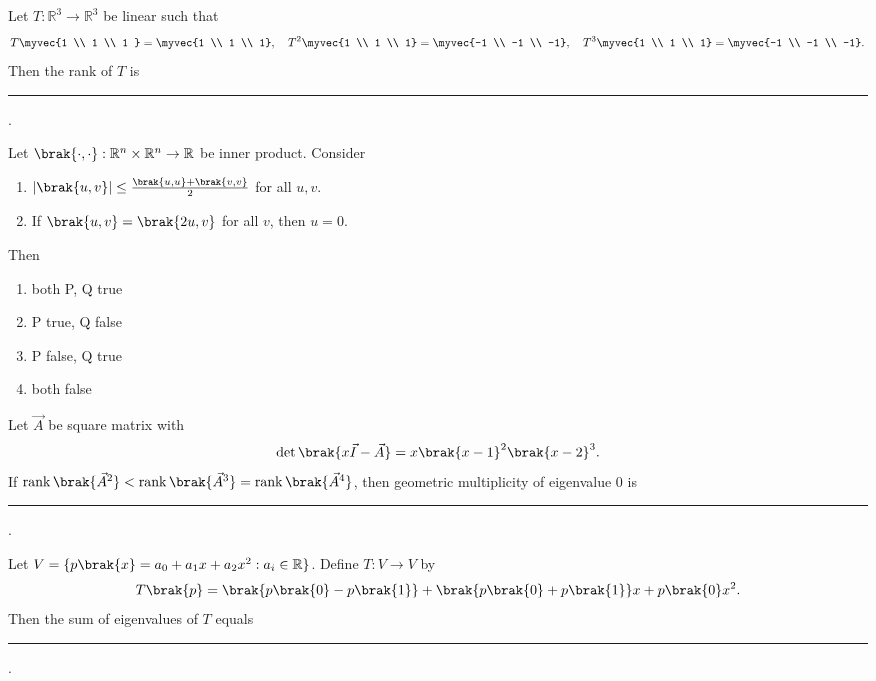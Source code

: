     \item Let $T:\mathbb{R}^3 \to \mathbb{R}^3$ be linear such that
    $$
    T \myvec{1 \\ 1 \\ 1 } = \myvec{1 \\ 1 \\ 1}, \quad T^2\myvec{1 \\ 1 \\ 1} = \myvec{-1 \\ -1 \\ -1}, \quad T^3 \myvec{1 \\ 1 \\ 1}=\myvec{-1 \\ -1 \\ -1}.
    $$
    Then the rank of $T$ is \rule{1cm}{0.01pt}.
\hfill{}
    \item Let $\brak{\cdot,\cdot}: \mathbb{R}^n \times \mathbb{R}^n \to \mathbb{R}$ be inner product. Consider
	    \begin{enumerate}[label=\Alph*:,start=16]
        \item  $|\brak{u,v}| \leq \frac{\brak{u,u} + \brak{v,v}}{2}$ for all $u,v$.
        \item  If $\brak{u,v} = \brak{2u,v}$ for all $v$, then $u=0$.
\end{enumerate}
    Then
    \begin{multicols}{2}
    \begin{enumerate}
        \item both P, Q true
        \item P true, Q false
        \item P false, Q true
        \item both false
    \end{enumerate}
\end{multicols}
\hfill{}
    \item Let $\vec{A}$ be square matrix with
    $$
    \det\brak{x\vec{I} - \vec{A}} = x \brak{x-1}^2 \brak{x-2}^3.
    $$
    If $\operatorname{rank}\brak{\vec{A}^2} < \operatorname{rank}\brak{\vec{A}^3} = \operatorname{rank}\brak{\vec{A}^4}$, then geometric multiplicity of eigenvalue 0 is  \rule{1cm}{0.01pt}.
\hfill{}
    \item Let $V = \{ p\brak{x} = a_0 + a_1 x + a_2 x^2 : a_i \in \mathbb{R} \}$. Define $T: V \to V$ by
    $$
    T\brak{p} = \brak{p\brak{0} - p\brak{1}} + \brak{p\brak{0} + p\brak{1}} x + p\brak{0} x^2.
    $$
    Then the sum of eigenvalues of $T$ equals \rule{1cm}{0.01pt}.
\hfill{}
